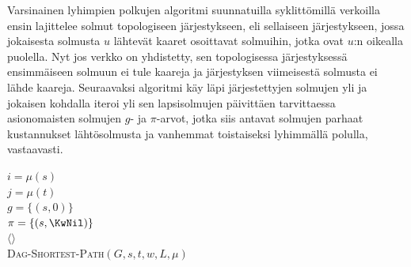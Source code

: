 \documentclass[finnish]{tktltiki2}
\newenvironment{finalgo}[1][htb]{
  \renewcommand{\algorithmcfname}{Algoritmi}
  \begin{algorithm}[#1]
}{\end{algorithm}}
\theoremstyle{definition}
\theoremstyle{remark}
\begin{document}
Varsinainen lyhimpien polkujen algoritmi suunnatuilla syklittömillä verkoilla ensin lajittelee solmut topologiseen järjestykseen, eli sellaiseen järjestykseen, jossa jokaisesta solmusta $u$ lähtevät kaaret osoittavat solmuihin, jotka ovat $u$:n oikealla puolella. Nyt jos verkko on yhdistetty, sen topologisessa järjestyksessä ensimmäiseen solmuun ei tule kaareja ja järjestyksen viimeisestä solmusta ei lähde kaareja. Seuraavaksi algoritmi käy läpi järjestettyjen solmujen yli ja jokaisen kohdalla iteroi yli sen lapsisolmujen päivittäen tarvittaessa asionomaisten solmujen $g$- ja $\pi$-arvot, jotka siis antavat solmujen parhaat kustannukset lähtösolmusta ja vanhemmat toistaiseksi lyhimmällä polulla, vastaavasti.
\begin{finalgo}[h]
$i = \mu(s)$ \\
$j = \mu(t)$ \\
$g = \{ (s, 0) \}$ \\
$\pi = \{ (s, \KwNil) \}$ \\
\KwRet $\langle \rangle$ \\
\caption{\textsc{Dag-Shortest-Path}$(G, s, t, w, L, \mu)$}
\label{alg:dagsp}
\end{finalgo}
\end{document}
